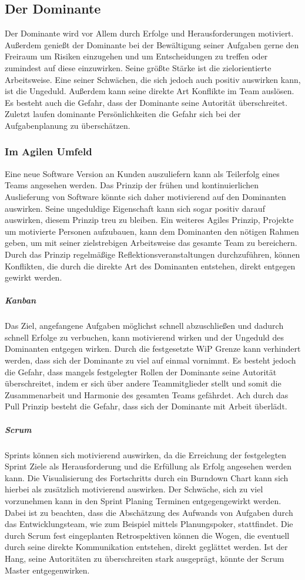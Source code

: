 \documentclass[twocolumn,10pt]{asme2ej}
\begin{document}
\subsection{Der Dominante}
Der Dominante  wird vor Allem durch Erfolge und Herausforderungen motiviert. Außerdem genießt der Dominante bei der Bewältigung seiner Aufgaben gerne den Freiraum um Risiken einzugehen und um Entscheidungen zu treffen oder zumindest auf diese einzuwirken. Seine größte Stärke ist die zielorientierte Arbeitsweise. Eine seiner Schwächen, die sich jedoch auch positiv auswirken kann, ist die Ungeduld. Außerdem kann seine direkte Art Konflikte im Team auslösen. Es besteht auch die Gefahr, dass der Dominante seine Autorität überschreitet. Zuletzt laufen dominante Persönlichkeiten die Gefahr sich bei der Aufgabenplanung zu überschätzen.

\subsubsection{Im Agilen Umfeld}
Eine neue Software Version an Kunden auszuliefern kann als Teilerfolg eines Teams angesehen werden. Das Prinzip der frühen und kontinuierlichen Auslieferung von Software könnte sich daher motivierend auf den Dominanten auswirken. Seine ungeduldige Eigenschaft kann sich sogar positiv darauf auswirken, diesem Prinzip treu zu bleiben. Ein weiteres Agiles Prinzip, Projekte um motivierte Personen aufzubauen, kann dem Dominanten den nötigen Rahmen geben, um mit seiner zielstrebigen Arbeitsweise das gesamte Team zu bereichern. Durch das Prinzip regelmäßige Reflektionsveranstaltungen durchzuführen, können Konflikten, die durch die direkte Art des Dominanten entstehen, direkt entgegen gewirkt werden.

\subparagraph{Kanban} Das Ziel, angefangene Aufgaben möglichst schnell abzuschließen und dadurch schnell Erfolge zu verbuchen, kann motivierend wirken und der Ungeduld des Dominanten entgegen wirken. Durch die festgesetzte WiP Grenze kann verhindert werden, dass sich der Dominante zu viel auf einmal vornimmt. Es besteht jedoch die Gefahr, dass mangels festgelegter Rollen der Dominante seine Autorität überschreitet, indem er sich über andere Teammitglieder stellt und somit die Zusammenarbeit und Harmonie des gesamten Teams gefährdet. Ach durch das Pull Prinzip besteht die Gefahr, dass sich der Dominante mit Arbeit überlädt.

\subparagraph{Scrum} Sprints können sich motivierend auswirken, da die Erreichung der festgelegten Sprint Ziele als Herausforderung und die Erfüllung als Erfolg angesehen werden kann. Die Visualisierung des Fortschritts durch ein Burndown Chart kann sich hierbei als zusätzlich motivierend auswirken. Der Schwäche, sich zu viel vorzunehmen kann in den Sprint Planing Terminen entgegengewirkt werden. Dabei ist zu beachten, dass die Abschätzung des Aufwands von Aufgaben durch das Entwicklungsteam, wie zum Beispiel mittels Planungspoker, stattfindet. Die durch Scrum fest eingeplanten Retrospektiven können die Wogen, die eventuell durch seine direkte Kommunikation entstehen, direkt geglättet werden. Ist der Hang, seine Autoritäten zu überschreiten stark ausgeprägt, könnte der Scrum Master entgegenwirken.
\end{document}
